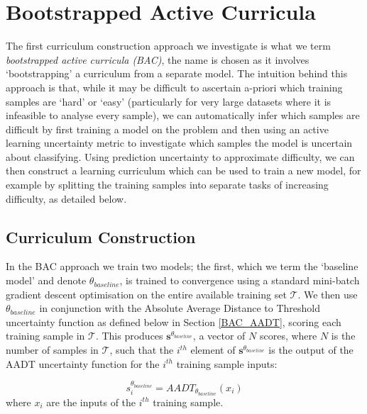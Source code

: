 \chapter{Bootstrapped Active Curricula}\label{ch:BootstrappedActiveCurricula}
The first curriculum construction approach we investigate is what we term \textit{bootstrapped active curricula (BAC)}, the name is chosen as it involves `bootstrapping' a curriculum from a separate model. The intuition behind this approach is that, while it may be difficult to ascertain a-priori which training samples are `hard' or `easy' (particularly for very large datasets where it is infeasible to analyse every sample), we can automatically infer which samples are difficult by first training a model on the problem and then using an active learning uncertainty metric to investigate which samples the model is uncertain about classifying. Using prediction uncertainty to approximate difficulty, we can then construct a learning curriculum which can be used to train a new model, for example by splitting the training samples into separate tasks of increasing difficulty, as detailed below.
\section{Curriculum Construction}
In the BAC approach we train two models; the first, which we term the `baseline model' and denote  $\theta_{baseline}$, is trained to convergence using a standard mini-batch gradient descent optimisation on the entire available training set $\mathcal{T}$. We then use $\theta_{baseline}$ in conjunction with the Absolute Average Distance to Threshold uncertainty function as defined below in Section \ref{BAC_AADT}, scoring each training sample in $\mathcal{T}$. This produces $\mathbf{s}^{\theta_{baseline}}$, a vector of $N$ scores, where $N$ is the number of samples in $\mathcal{T}$, such that the $i^{th}$ element of $\mathbf{s}^{\theta_{baseline}}$ is the output of the AADT uncertainty function for the $i^{th}$ training sample inputs:

\begin{equation}\label{eq:BAC_S}
s^{\theta_{baseline}}_i = AADT_{\theta_{baseline}}(x_i) 
\end{equation}
where $x_i$ are the inputs of the $i^{th}$ training sample. 

